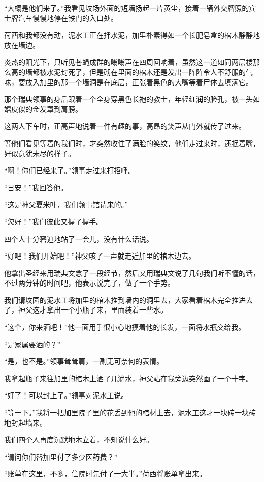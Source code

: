 \par “大概是他们来了。”我看见坟场外面的短墙扬起一片黄尘，接着一辆外交牌照的宾士牌汽车慢慢地停在铁门的入口处。
\par 荷西和我都没有动，泥水工正在拌水泥，加里朴素得如一个长肥皂盒的棺木静静地放在墙边。
\par 炎热的阳光下，只听见苍蝇成群的嗡嗡声在四周回响着，虽然这一道如同两层楼那么高的墙都被水泥封死了，但是砌在里面的棺木还是发出一阵阵令人不舒服的气味，要放入加里的那一个墙洞是在底层，正张着黑色的大嘴等着尸体去填满它。
\par 那个瑞典领事的身后跟着一个全身穿黑色长袍的教士，年轻红润的脸孔，被一头如嬉皮似的金发罩到肩膀。
\par 这两人下车时，正高声地说着一件有趣的事，高昂的笑声从门外就传了过来。
\par 等他们看见等着的我们时，才突然收住了满脸的笑纹，他们走过来时，还抿着嘴，好似意犹未尽的样子。
\par “啊！你们已经来了。”领事走过来打招呼。
\par “日安！”我回答他。
\par “这是神父夏米叶，我们领事馆请来的。”
\par “您好！”我们彼此又握了握手。
\par 四个人十分窘迫地站了一会儿，没有什么话说。
\par “好吧！我们开始吧！”神父咳了一声就走近加里的棺木边去。
\par 他拿出圣经来用瑞典文念了一段经节，然后又用瑞典文说了几句我们听不懂的话，不过两分钟的时间吧，他表示说完了，做了一个手势。
\par 我们请坟园的泥水工将加里的棺木推到墙内的洞里去，大家看着棺木完全推进去了，神父这才拿出一个小瓶子来，里面装着一些水。
\par “这个，你来洒吧！”他一面用手很小心地摸着他的长发，一面将水瓶交给我。
\par “是家属要洒的？”
\par “是，也不是。”领事耸耸肩，一副无可奈何的表情。
\par 我拿起瓶子来往加里的棺木上洒了几滴水，神父站在我旁边突然画了一个十字。
\par “好了！可以封上了。”领事对泥水工说。
\par “等一下。”我将一把加里院子里的花丢到他的棺材上去，泥水工这才一块砖一块砖地封起墙来。
\par 我们四个人再度沉默地木立着，不知说什么好。
\par “请问你们替加里付了多少医药费？”
\par “账单在这里，不多，住院时先付了一大半。”荷西将账单拿出来。
